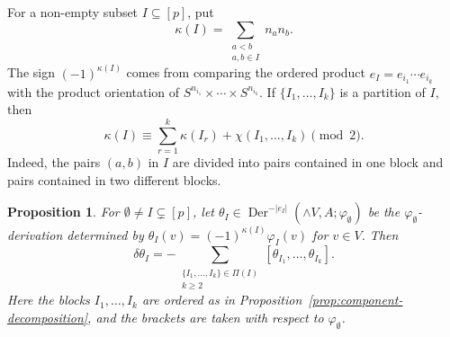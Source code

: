 \documentclass[a4paper,10pt]{amsart}
\newtheorem{prop}[thm]{Proposition}
\theoremstyle{definition}
\theoremstyle{remark}
\newcommand{\Der}{\operatorname{Der}}
\numberwithin{equation}{section}
\begin{document}
For a non-empty subset $I\subseteq [p]$, put
\[
\kappa (I)
=
\sum_{\substack{a<b\\ a,b\in I}} n_a n_b .
\]
The sign $(-1)^{\kappa(I)}$ comes from comparing the ordered product
$e_I=e_{i_1}\cdots e_{i_k}$ with the product orientation of
$S^{n_{i_1}}\times\cdots\times S^{n_{i_k}}$.
If $\{I_1,\ldots,I_k\}$ is a partition of $I$, then
\[
\kappa(I)
\equiv
\sum_{r=1}^k \kappa(I_r)
+
\chi(I_1,\ldots,I_k)
\pmod 2.
\]
Indeed, the pairs $(a,b)$ in $I$ are divided into pairs contained in one block
and pairs contained in two different blocks.


\begin{prop}\label{prop:differential-identity}
For $\emptyset\ne I\subsetneq [p]$, let
$
\theta_I\in \Der^{-|e_I|}(\wedge V,A;\varphi_{\emptyset})
$
be the $\varphi_{\emptyset}$-derivation determined by
$
        \theta_I(v)=(-1)^{\kappa(I)}\varphi_I(v)
$
for $v\in V$.
Then
\[
\delta\theta_I
=
-
\sum_{\substack{\{I_1,\ldots,I_k\}\in\Pi(I)\\ k\geq 2}}
[
\theta_{I_1},
\ldots,
\theta_{I_k}
].
\]
Here the blocks $I_1,\ldots,I_k$ are ordered as in
Proposition~\ref{prop:component-decomposition}, and the brackets are taken
with respect to $\varphi_{\emptyset}$.
\end{prop}
\end{document}
